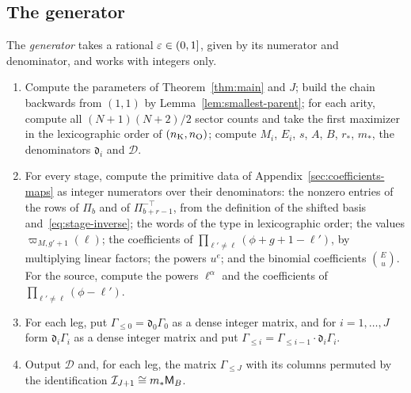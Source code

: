 \subsection{The generator}
\label{sec:coefficients-generator}

The \emph{generator} takes a rational \(\varepsilon\in(0,1]\), given by its
numerator and denominator, and works with integers only.
\begin{enumerate}
\item Compute the parameters of Theorem~\ref{thm:main} and \(J\); build
 the chain backwards from \((1,1)\) by Lemma~\ref{lem:smallest-parent};
 for each arity, compute all \((N+1)(N+2)/2\) sector counts and take the
 first maximizer in the lexicographic order of \((n_{\mathrm K},n_{\mathrm O})\); compute
 \(M_i\), \(E_i\), \(s\), \(A\), \(B\), \(r_*\), \(m_*\), the
 denominators \(\mathfrak d_i\) and \(\mathcal D\).
\item For every stage, compute the primitive data of
 Appendix~\ref{sec:coefficients-maps} as integer numerators over their
 denominators: the nonzero entries of the rows of \(\Pi_b\) and of
 \(\Pi_{b+r-1}^{-\top}\), from the definition of the shifted basis
 and~\eqref{eq:stage-inverse}; the words of the type in lexicographic
 order; the values
 \(\varpi_{M,g'+1}(\ell)\); the coefficients of
 \(\prod_{\ell'\ne\ell}(\phi+g+1-\ell')\), by multiplying linear factors;
 the powers \(u^e\); and the binomial coefficients \(\binom Eu\).
 For the source, compute the powers \(\ell^\alpha\) and the coefficients of
 \(\prod_{\ell'\ne\ell}(\phi-\ell')\).
\item For each leg, put \(\Gamma_{\le0}=\mathfrak d_0\Gamma_0\) as a dense
 integer matrix, and for \(i=1,\ldots,J\) form \(\mathfrak d_i\Gamma_i\)
 as a dense integer matrix and put
 \(\Gamma_{\le i}=\Gamma_{\le i-1}\cdot\mathfrak d_i\Gamma_i\).
\item Output \(\mathcal D\) and, for each leg, the matrix
 \(\Gamma_{\le J}\) with its columns permuted by the identification
 \(\mathcal I_{J+1}\cong m_*\mathsf M_B\).
\end{enumerate}

